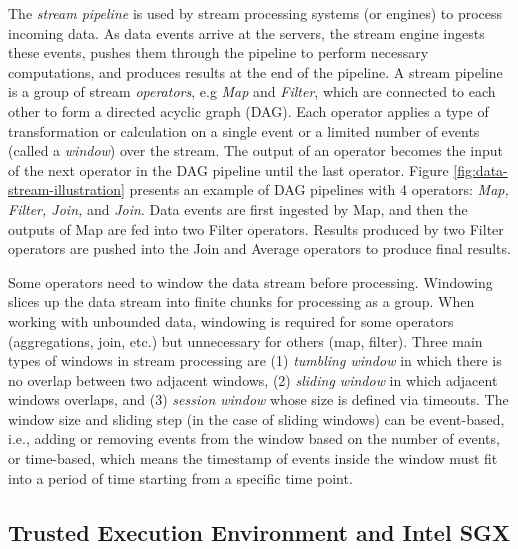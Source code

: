 The \textit{stream pipeline} is used by stream processing systems (or engines) to process incoming data. As data events arrive at the servers, the stream engine ingests these events, pushes them through the pipeline to perform necessary computations, and produces results at the end of the pipeline. A stream pipeline is a group of stream \textit{operators}, e.g \textit{Map} and \textit{Filter}, which are connected to each other to form a directed acyclic graph (DAG). Each operator applies a type of transformation or calculation on a single event or a limited number of events (called a \textit{window}) over the stream. The output of an operator becomes the input of the next operator in the DAG pipeline until the last operator. Figure \ref{fig:data-stream-illustration} presents an example of DAG pipelines with 4 operators: \textit{Map, Filter, Join,} and \textit{Join}. Data events are first ingested by Map, and then the outputs of Map are fed into two Filter operators. Results produced by two Filter operators are pushed into the Join and Average operators to produce final results.


Some operators need to window the data stream before processing. Windowing slices up the data stream into finite chunks for processing as a group. When working with unbounded data, windowing is required for some operators (aggregations, join, etc.) but unnecessary for others (map, filter). Three main types of windows in stream processing are (1) {\em tumbling window} in which there is no overlap between two adjacent windows, (2) {\em sliding window} in which adjacent windows overlaps, and (3) {\em session window} whose size is defined via timeouts. The window size and sliding step (in the case of sliding windows) can be event-based, i.e., adding or removing events from the window based on the number of events, or time-based, which means the timestamp of events inside the window must fit into a period of time starting from a specific time point.

\subsection{Trusted Execution Environment and Intel SGX}
\label{sec:trusted_execution_environment}


